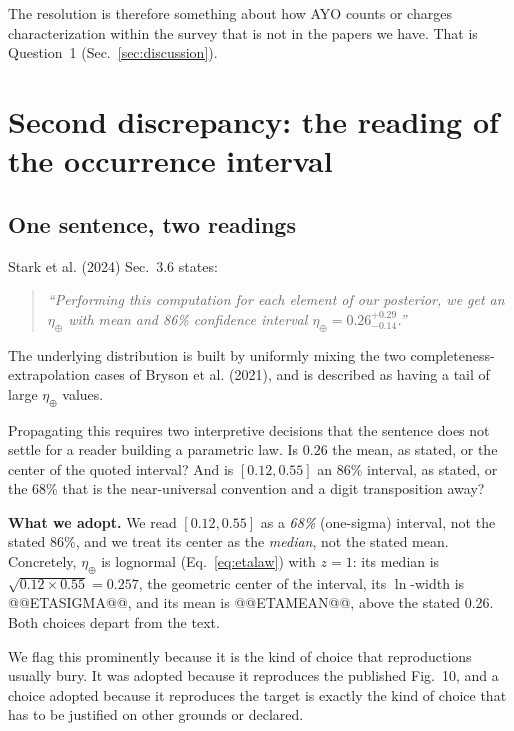 \documentclass[11pt,a4paper]{article}
\begin{document}
The resolution is therefore something about how AYO counts or charges characterization within the
survey that is not in the papers we have. That is Question~1 (Sec.~\ref{sec:discussion}).

\section{Second discrepancy: the reading of the occurrence interval}
\label{sec:eta}

\subsection{One sentence, two readings}

Stark et al. (2024) Sec.~3.6 states:
\begin{quote}
\emph{``Performing this computation for each element of our posterior, we get an $\eta_\oplus$
with mean and 86\% confidence interval $\eta_\oplus = 0.26^{+0.29}_{-0.14}$.''}
\end{quote}
The underlying distribution is built by uniformly mixing the two completeness-extrapolation cases
of Bryson et al. (2021), and is described as having a tail of large $\eta_\oplus$ values.

Propagating this requires two interpretive decisions that the sentence does not settle for a
reader building a parametric law. Is $0.26$ the mean, as stated, or the center of the quoted
interval? And is $[0.12, 0.55]$ an 86\% interval, as stated, or the 68\% that is the near-universal
convention and a digit transposition away?

\textbf{What we adopt.} We read $[0.12, 0.55]$ as a \emph{68\%} (one-sigma) interval, not the
stated 86\%, and we treat its center as the \emph{median}, not the stated mean. Concretely,
$\eta_\oplus$ is lognormal (Eq.~\ref{eq:etalaw}) with $z = 1$: its median is
$\sqrt{0.12 \times 0.55} = 0.257$, the geometric center of the interval, its $\ln$-width is
@@ETASIGMA@@, and its mean is @@ETAMEAN@@, above the stated 0.26. Both choices depart from the
text.

We flag this prominently because it is the kind of choice that reproductions usually bury. It was
adopted because it reproduces the published Fig.~10, and a choice adopted because it reproduces
the target is exactly the kind of choice that has to be justified on other grounds or declared.
\end{document}
